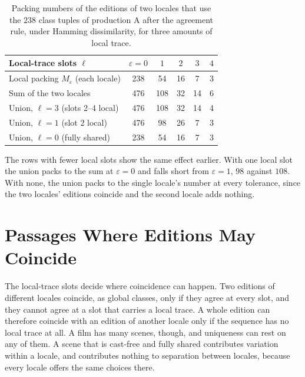 \documentclass[11pt,twoside,openright]{book}
\theoremstyle{plain}
\theoremstyle{definition}
\theoremstyle{remark}
\begin{document}
\begin{table}[ht]
\centering
\begin{tabular}{@{}lccccc@{}}
\toprule
Local-trace slots $\ell$ & $\varepsilon=0$ & $1$ & $2$ & $3$ & $4$\\
\midrule
Local packing $M_\varepsilon$ (each locale) & 238 & 54 & 16 & 7 & 3\\
Sum of the two locales & 476 & 108 & 32 & 14 & 6\\
\midrule
Union, $\ell=3$ (slots 2--4 local) & 476 & 108 & 32 & 14 & 4\\
Union, $\ell=1$ (slot 2 local) & 476 & 98 & 26 & 7 & 3\\
Union, $\ell=0$ (fully shared) & 238 & 54 & 16 & 7 & 3\\
\bottomrule
\end{tabular}
\caption{Packing numbers of the editions of two locales that use the $238$ class tuples of production A after the agreement rule, under Hamming dissimilarity, for three amounts of local trace.}\label{tab:sep11}
\end{table}

The rows with fewer local slots show the same effect earlier. With one local slot the union packs to the sum at $\varepsilon=0$ and falls short from $\varepsilon=1$, $98$ against $108$. With none, the union packs to the single locale's number at every tolerance, since the two locales' editions coincide and the second locale adds nothing.

\section{Passages Where Editions May Coincide}\label{sec:coincide}

The local-trace slots decide where coincidence can happen. Two editions of different locales coincide, as global classes, only if they agree at every slot, and they cannot agree at a slot that carries a local trace. A whole edition can therefore coincide with an edition of another locale only if the sequence has no local trace at all. A film has many scenes, though, and uniqueness can rest on any of them. A scene that is cast-free and fully shared contributes variation within a locale, and contributes nothing to separation between locales, because every locale offers the same choices there.
\end{document}
